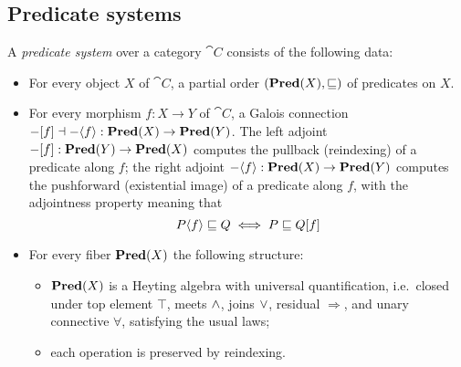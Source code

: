 \subsection{Predicate systems}
\label{sec:predicate-system}

A \emph{predicate system} over a category $\cat{C}$ consists of the following data:
\begin{itemize}
\item For every object $X$ of $\cat{C}$, a partial order $(\mathbf{Pred}(X), \sqsubseteq)$ of predicates on $X$.
\item For every morphism $f: X \to Y$ of $\cat{C}$, a Galois connection $-[f] \dashv
-\langle f\rangle : \mathbf{Pred}(X) \to \mathbf{Pred}(Y)$. The left adjoint $-[f]: \mathbf{Pred}(Y) \to \mathbf{Pred}(X)$ computes
the pullback (reindexing) of a predicate along $f$; the right adjoint $-\langle f\rangle: \mathbf{Pred}(X) \to
\mathbf{Pred}(Y)$ computes the pushforward (existential image) of a predicate along $f$, with the adjointness property
meaning that
\[P\langle f\rangle \sqsubseteq Q \iff P \sqsubseteq Q[f] \]
\item For every fiber $\mathbf{Pred}(X)$ the following structure:
   \begin{itemize}
   \item $\mathbf{Pred}(X)$ is a Heyting algebra with universal quantification, i.e.~closed under top element $\top$,
   meets $\wedge$, joins $\vee$, residual $\Rightarrow$, and unary connective $\forall$, satisfying the usual
   laws;
   \item each operation is preserved by reindexing.
   \end{itemize}
\end{itemize}
